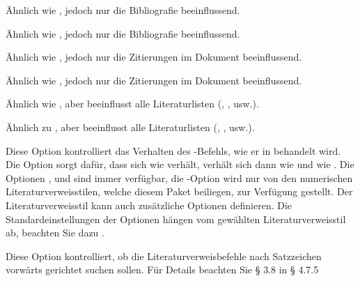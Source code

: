 \documentclass{ltxdockit}[2011/03/25]
\begin{document}
\begin{optionlist}

Ähnlich wie , jedoch nur die Bibliografie beeinflussend.


Ähnlich wie , jedoch nur die Bibliografie beeinflussend.


Ähnlich wie  , jedoch nur die Zitierungen im Dokument
beeinflussend.


Ähnlich wie  , jedoch nur die Zitierungen im Dokument
beeinflussend.


Ähnlich wie , aber beeinflusst alle Literaturlisten
(, , usw.).


Ähnlich zu , aber beeinflusst alle Literaturlisten
(, , usw.).


Diese Option kontrolliert das Verhalten des -Befehls, wie er in
 behandelt wird. Die Option  sorgt dafür, dass sich
 wie  verhält,  verhält sich dann wie
 und  wie . Die Optionen
,  und  sind immer verfügbar, die
-Option wird nur von den numerischen Literaturverweisstilen,
welche diesem Paket beiliegen, zur Verfügung gestellt. Der Literaturverweisstil
kann auch zusätzliche Optionen definieren. Die Standardeinstellungen der Optionen
hängen vom gewählten Literaturverweisstil ab, beachten Sie dazu
.


Diese Option kontrolliert, ob die Literaturverweisbefehle nach Satzzeichen
vorwärts gerichtet suchen sollen. Für Details beachten Sie § 3.8  %
 in § 4.7.5 %



\end{optionlist}
\end{document}
